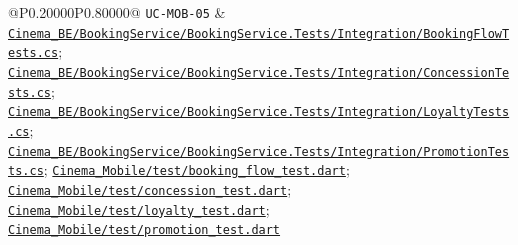 \begin{longtable}{@{}P{0.20000\SRSWidth}P{0.80000\SRSWidth}@{}}
\texttt{UC-\allowbreak{}MOB-\allowbreak{}05} & \href{../../../Cinema\_BE/BookingService/BookingService.Tests/Integration/BookingFlowTests.cs}{\texttt{Cinema\_\allowbreak{}BE/\allowbreak{}Booking\allowbreak{}Service/\allowbreak{}Booking\allowbreak{}Service.\allowbreak{}Tests/\allowbreak{}Integrat\allowbreak{}ion/\allowbreak{}Booking\allowbreak{}Flow\allowbreak{}Tests.\allowbreak{}cs}}; \href{../../../Cinema\_BE/BookingService/BookingService.Tests/Integration/ConcessionTests.cs}{\texttt{Cinema\_\allowbreak{}BE/\allowbreak{}Booking\allowbreak{}Service/\allowbreak{}Booking\allowbreak{}Service.\allowbreak{}Tests/\allowbreak{}Integrat\allowbreak{}ion/\allowbreak{}Concessi\allowbreak{}on\allowbreak{}Tests.\allowbreak{}cs}}; \href{../../../Cinema\_BE/BookingService/BookingService.Tests/Integration/LoyaltyTests.cs}{\texttt{Cinema\_\allowbreak{}BE/\allowbreak{}Booking\allowbreak{}Service/\allowbreak{}Booking\allowbreak{}Service.\allowbreak{}Tests/\allowbreak{}Integrat\allowbreak{}ion/\allowbreak{}Loyalty\allowbreak{}Tests.\allowbreak{}cs}}; \href{../../../Cinema\_BE/BookingService/BookingService.Tests/Integration/PromotionTests.cs}{\texttt{Cinema\_\allowbreak{}BE/\allowbreak{}Booking\allowbreak{}Service/\allowbreak{}Booking\allowbreak{}Service.\allowbreak{}Tests/\allowbreak{}Integrat\allowbreak{}ion/\allowbreak{}Promotio\allowbreak{}n\allowbreak{}Tests.\allowbreak{}cs}}; \href{../../../Cinema\_Mobile/test/booking\_flow\_test.dart}{\texttt{Cinema\_\allowbreak{}Mobile/\allowbreak{}test/\allowbreak{}booking\_\allowbreak{}flow\_\allowbreak{}test.\allowbreak{}dart}}; \href{../../../Cinema\_Mobile/test/concession\_test.dart}{\texttt{Cinema\_\allowbreak{}Mobile/\allowbreak{}test/\allowbreak{}concessi\allowbreak{}on\_\allowbreak{}test.\allowbreak{}dart}}; \href{../../../Cinema\_Mobile/test/loyalty\_test.dart}{\texttt{Cinema\_\allowbreak{}Mobile/\allowbreak{}test/\allowbreak{}loyalty\_\allowbreak{}test.\allowbreak{}dart}}; \href{../../../Cinema\_Mobile/test/promotion\_test.dart}{\texttt{Cinema\_\allowbreak{}Mobile/\allowbreak{}test/\allowbreak{}promotio\allowbreak{}n\_\allowbreak{}test.\allowbreak{}dart}} \\[3pt]

\end{longtable}
